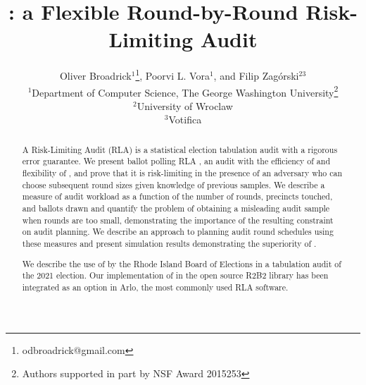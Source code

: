 
\date{}

\title{\Large \bf \Providence: a Flexible Round-by-Round Risk-Limiting Audit}
\author{
{\rm Oliver Broadrick$^1$\thanks{odbroadrick@gmail.com}, Poorvi L. Vora$^1$, and Filip Zag{\'o}rski$^{23}$}\\
$^1$Department of Computer Science, The George Washington University\thanks{Authors supported in part by NSF Award 2015253}\\
$^2$University of Wroclaw\\
$^3$Votifica
}
\maketitle

\begin{abstract}
A Risk-Limiting Audit (RLA) is a statistical election tabulation audit with a rigorous error guarantee. We present ballot polling RLA \Providence, an audit with the efficiency of \Minerva and flexibility of \BRAVO, and prove that it is risk-limiting in the presence of an adversary who can choose subsequent round sizes given knowledge of previous samples. We describe a measure of audit workload as a function of the number of rounds, precincts touched, and ballots drawn and quantify the problem of obtaining a misleading audit sample when rounds are too small, demonstrating the importance of the resulting constraint on audit planning. We describe an approach to planning audit round schedules using these measures and present simulation results demonstrating the superiority of \Providence. 

We describe the use of \Providence by the Rhode Island Board of Elections in a tabulation audit of the 2021 election. 
Our implementation of \Providence 
in the open source R2B2 library has been integrated as an option in Arlo, the most commonly used RLA software.

\end{abstract}
%
%

